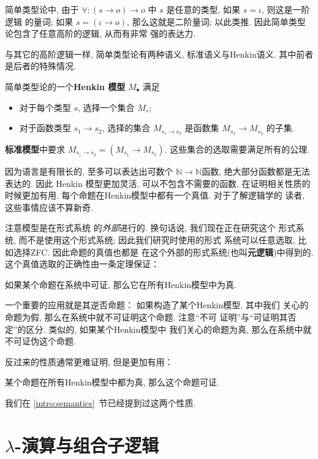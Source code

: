 简单类型论中, 由于 \(\forall : (s \to o) \to o\) 中
\(s\) 是任意的类型, 如果 \(s = \iota\), 则这是一阶逻辑
的量词; 如果 \(s = (\iota \to o)\), 那么这就是二阶量词;
以此类推. 因此简单类型论包含了任意高阶的逻辑, 从而有非常
强的表达力.

与其它的高阶逻辑一样, 简单类型论有两种语义, 标准语义与Henkin语义.
其中前者是后者的特殊情况.

\begin{definition}
简单类型论的一个\textbf{Henkin 模型} \(M_\bullet\) 满足
\begin{itemize}
\item 对于每个类型 \(s\), 选择一个集合 \(M_s\);
\item 对于函数类型 \(s_1 \to s_2\), 选择的集合 \(M_{s_1 \to s_2}\)
是函数集 \(M_{s_1} \to M_{s_2}\) 的子集.
\end{itemize}
\textbf{标准模型}中要求 \(M_{s_1 \to s_2} =
(M_{s_1} \to M_{s_2})\). 这些集合的选取需要满足所有的公理.
\end{definition}
因为语言是有限长的, 至多可以表达出可数个
\(\mathbb N \to \mathbb N\)函数,
绝大部分函数都是无法表达的. 因此 Henkin 模型更加灵活,
可以不包含不需要的函数, 在证明相关性质的时候更加有用.
每个命题在Henkin模型中都有一个真值. 对于了解逻辑学的
读者, 这些事情应该不算新奇.

注意模型是在形式系统
的\emph{外部}进行的. 换句话说, 我们现在正在研究这个
形式系统, 而不是使用这个形式系统; 因此我们研究时使用的形式
系统可以任意选取, 比如选择ZFC. 因此命题的真值也都是
在这个外部的形式系统(也叫\textbf{元逻辑})中得到的.
这个真值选取的正确性由一条定理保证：
\begin{theorem}[Henkin可靠性]
如果某个命题在系统中可证, 那么它在所有Henkin模型中为真.
\end{theorem}
一个重要的应用就是其逆否命题：
如果构造了某个Henkin模型, 其中我们
关心的命题为假, 那么在系统中就不可证明这个命题. 注意“不可
证明”与“可证明其否定”的区分. 类似的, 如果某个Henkin模型中
我们关心的命题为真, 那么在系统中就不可证伪这个命题.

反过来的性质通常更难证明, 但是更加有用：
\begin{theorem}[Henkin完备性]
某个命题在所有Henkin模型中都为真, 那么这个命题可证.
\end{theorem}
我们在 \ref{intro:semantics}~节已经提到过这两个性质.

\section{\texorpdfstring{\(\lambda\)}{Lambda}-演算与组合子逻辑}
